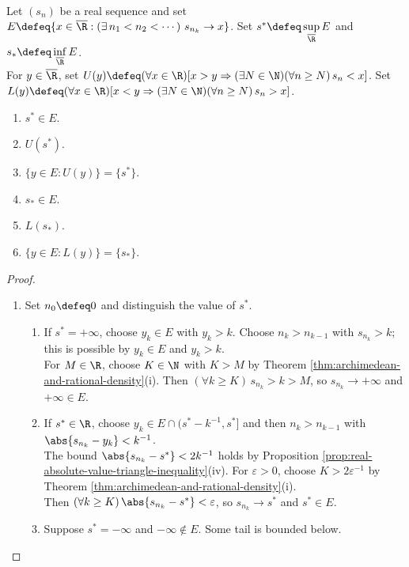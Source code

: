 \begin{theorem} \label{thm:limsup-characterization} \\
Let $(s_n)$ be a real sequence and set $E\defeq\{x\in\overline{\R}:(\exists\,n_1<n_2<\cdots)\ s_{n_k}\to x\}$. Set $s^*\defeq\sup\limits_{\overline{\R}}E$ and $s_*\defeq\inf\limits_{\overline{\R}}E$.\\
For $y\in\overline{\R}$, set $U(y)\defeq(\forall x\in\R)[x>y\Rightarrow(\exists N\in\N)(\forall n\geq N)\,s_n<x]$. Set $L(y)\defeq(\forall x\in\R)[x<y\Rightarrow(\exists N\in\N)(\forall n\geq N)\,s_n>x]$.
\begin{enumerate}[label=(\roman*)]
\setlength{\itemsep}{0pt}
\item $s^*\in E$.
\item $U(s^*)$.
\item $\{y\in E:U(y)\}=\{s^*\}$.
\item $s_*\in E$.
\item $L(s_*)$.
\item $\{y\in E:L(y)\}=\{s_*\}$.
\end{enumerate}
\begin{proof}
\begin{enumerate}[label=(\roman*)]
\setlength{\itemsep}{0pt}
\item Set $n_0\defeq0$ and distinguish the value of $s^*$.
\begin{enumerate}[label=(\alph*)]
\setlength{\itemsep}{0pt}
\item If $s^*=+\infty$, choose $y_k\in E$ with $y_k>k$. Choose $n_k>n_{k-1}$ with $s_{n_k}>k$; this is possible by $y_k\in E$ and $y_k>k$.\\
For $M\in\R$, choose $K\in\N$ with $K>M$ by Theorem \ref{thm:archimedean-and-rational-density}(i). Then $(\forall k\geq K)\,s_{n_k}>k>M$, so $s_{n_k}\to+\infty$ and $+\infty\in E$.
\item If $s^*\in\R$, choose $y_k\in E\cap(s^*-k^{-1},s^*]$ and then $n_k>n_{k-1}$ with $\abs{s_{n_k}-y_k}<k^{-1}$.\\
The bound $\abs{s_{n_k}-s^*}<2k^{-1}$ holds by Proposition \ref{prop:real-absolute-value-triangle-inequality}(iv). For $\varepsilon>0$, choose $K>2\varepsilon^{-1}$ by Theorem \ref{thm:archimedean-and-rational-density}(i).\\
Then $(\forall k\geq K)\,\abs{s_{n_k}-s^*}<\varepsilon$, so $s_{n_k}\to s^*$ and $s^*\in E$.
\item Suppose $s^*=-\infty$ and $-\infty\notin E$. Some tail is bounded below.\\

\end{enumerate}
\end{enumerate}
\end{proof}
\end{theorem}
